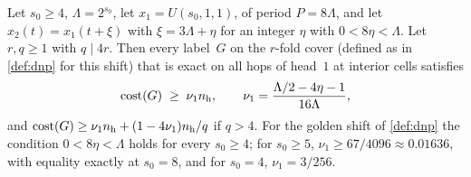\begin{theorem}[Theorem E$_1$]\label{thm:E1}
\notformalized
Let $s_0\ge4$, $\Lambda=2^{s_0}$, let $x_1=U(s_0,1,1)$, of period $P=8\Lambda$, and let $x_2(t)=x_1(t+\xi)$ with
$\xi=3\Lambda+\eta$ for an integer $\eta$ with $0<8\eta<\Lambda$. Let $r,q\ge1$ with $q\mid4r$. Then every label~$G$ on
the $r$-fold cover (defined as in \cref{def:dnp} for this shift) that is exact on all hops of head~$1$ at interior
cells satisfies
\[
  \mathrm{cost}(G)\;\ge\;\nu_1n_{\mathrm h},\qquad\nu_1=\frac{\Lambda/2-4\eta-1}{16\Lambda},
\]
and $\mathrm{cost}(G)\ge\nu_1n_{\mathrm h}+(1-4\nu_1)n_{\mathrm h}/q$ if $q>4$. For the golden shift of \cref{def:dnp} the
condition $0<8\eta<\Lambda$ holds for every $s_0\ge4$; for $s_0\ge5$, $\nu_1\ge67/4096\approx0.01636$, with equality
exactly at $s_0=8$, and for $s_0=4$, $\nu_1=3/256$.
\end{theorem}

